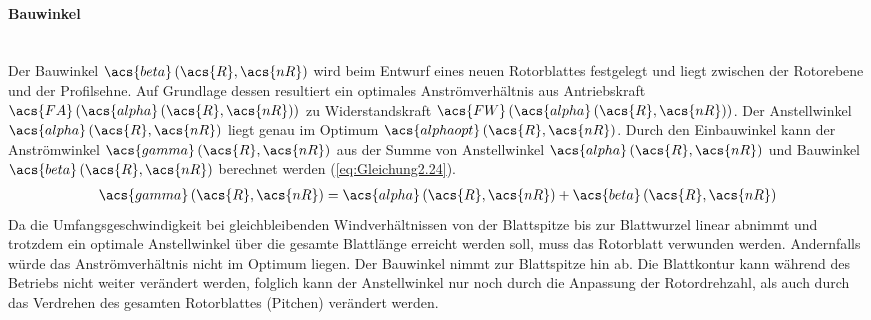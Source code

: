 \paragraph{Bauwinkel}\mbox{}\smallskip\\
Der Bauwinkel $\acs{beta}\left(\acs{R}, \acs{nR}\right)$ wird beim Entwurf eines neuen Rotorblattes festgelegt und liegt zwischen der Rotorebene und der Profilsehne. Auf Grundlage dessen resultiert ein optimales Anströmverhältnis aus Antriebskraft $\acs{FA}\left(\acs{alpha}\left(\acs{R}, \acs{nR}\right)\right)$ zu Widerstandskraft $\acs{FW}\left(\acs{alpha}\left(\acs{R}, \acs{nR}\right)\right)$. Der Anstellwinkel $\acs{alpha}\left(\acs{R}, \acs{nR}\right)$ liegt genau im Optimum $\acs{alphaopt}\left(\acs{R}, \acs{nR}\right)$. Durch den Einbauwinkel kann der Anströmwinkel $\acs{gamma}\left(\acs{R}, \acs{nR}\right)$ aus der Summe von Anstellwinkel $\acs{alpha}\left(\acs{R}, \acs{nR}\right)$ und Bauwinkel $\acs{beta}\left(\acs{R}, \acs{nR}\right)$ berechnet werden (\autoref{eq:Gleichung2.24}).
\begin{align} \label{eq:Gleichung2.24}
	\acs{gamma}\left(\acs{R}, \acs{nR}\right) = \acs{alpha}\left(\acs{R}, \acs{nR}\right) + \acs{beta}\left(\acs{R}, \acs{nR}\right)
\end{align}
\newline
Da die Umfangsgeschwindigkeit bei gleichbleibenden Windverhältnissen von der Blattspitze bis zur Blattwurzel linear abnimmt und trotzdem ein optimale Anstellwinkel über die gesamte Blattlänge erreicht werden soll, muss das Rotorblatt verwunden werden. Andernfalls würde das Anströmverhältnis nicht im Optimum liegen. Der Bauwinkel nimmt zur Blattspitze hin ab. Die Blattkontur kann während des Betriebs nicht weiter verändert werden, folglich kann der Anstellwinkel nur noch durch die Anpassung der Rotordrehzahl, als auch durch das Verdrehen des gesamten Rotorblattes (Pitchen) verändert werden.


